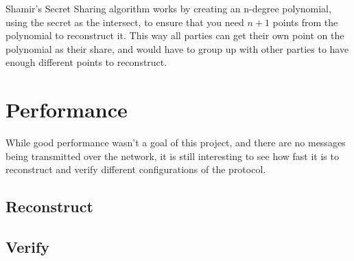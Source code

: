 \documentclass[a4paper,oneside,12pt,final]{article}
\begin{document}
Shamir's Secret Sharing algorithm works by creating an n-degree polynomial,
using the secret as the intersect, to ensure that you need $n+1$ points from the
polynomial to reconstruct it. This way all parties can get their own point on
the polynomial as their share, and would have to group up with other parties to
have enough different points to reconstruct.

\section{Performance}

While good performance wasn't a goal of this project, and there are no messages
being transmitted over the network, it is still interesting to see how fast it
is to reconstruct and verify different configurations of the protocol.

\subsection{Reconstruct}
\subsection{Verify}
\end{document}
